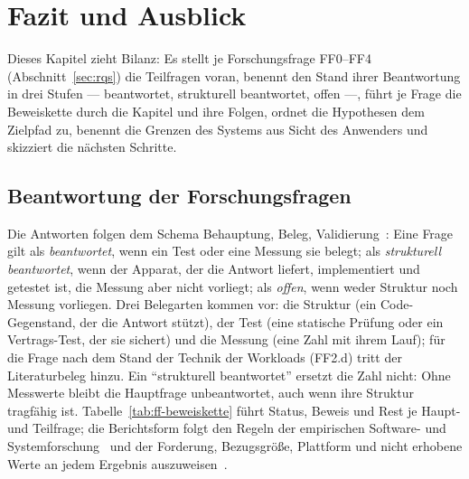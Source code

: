 \chapter{Fazit und Ausblick}\label{ch:conclusion}

Dieses Kapitel zieht Bilanz: Es stellt je Forschungsfrage FF0--FF4 (Abschnitt~\ref{sec:rqs}) die
Teilfragen voran, benennt den Stand ihrer Beantwortung in drei Stufen --- beantwortet, strukturell
beantwortet, offen ---, führt je Frage die Beweiskette durch die Kapitel und ihre Folgen, ordnet die
Hypothesen dem Zielpfad zu, benennt die Grenzen des Systems aus Sicht des Anwenders und skizziert die
nächsten Schritte.

\section{Beantwortung der Forschungsfragen}\label{sec:answers}
Die Antworten folgen dem Schema Behauptung, Beleg, Validierung~\cite{shaw2003writing}: Eine Frage gilt
als \emph{beantwortet}, wenn ein Test oder eine Messung sie belegt; als \emph{strukturell
beantwortet}, wenn der Apparat, der die Antwort liefert, implementiert und getestet ist, die Messung aber
nicht vorliegt; als \emph{offen}, wenn weder Struktur noch Messung vorliegen. Drei Belegarten kommen vor: die
Struktur (ein Code-Gegenstand, der die Antwort stützt), der Test (eine statische Prüfung oder ein
Vertrags-Test, der sie sichert) und die Messung (eine Zahl mit ihrem Lauf); für die Frage nach dem
Stand der Technik der Workloads (FF2.d) tritt der Literaturbeleg hinzu. Ein \enquote{strukturell
beantwortet} ersetzt die Zahl nicht: Ohne Messwerte bleibt die Hauptfrage unbeantwortet, auch wenn ihre
Struktur tragfähig ist. Tabelle~\ref{tab:ff-beweiskette} führt Status, Beweis und Rest je Haupt- und Teilfrage;
die Berichtsform folgt den Regeln der empirischen Software- und
Systemforschung~\cite{wohlin2012experimentation,runeson2009guidelines} und der Forderung, Bezugsgröße,
Plattform und nicht erhobene Werte an jedem Ergebnis auszuweisen~\cite{blackburn2016truth,hoefler2015benchmarking}.

